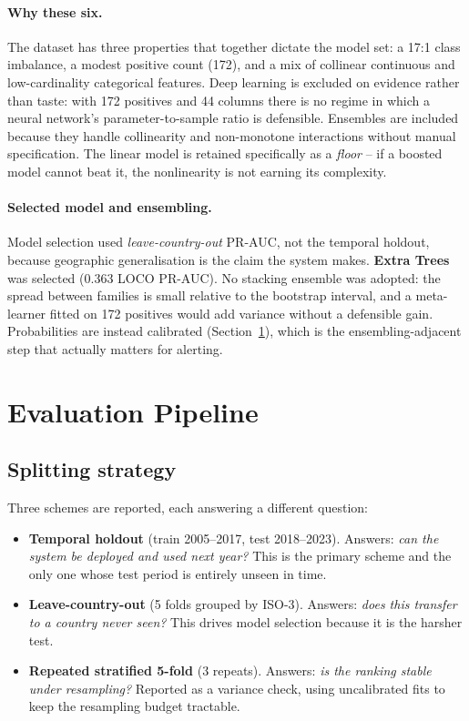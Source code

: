 \documentclass[11pt]{article}
\begin{document}
\paragraph{Why these six.} The dataset has three properties that together dictate the model set:
a 17:1 class imbalance, a modest positive count
(172), and a mix of collinear continuous and low-cardinality categorical features.
Deep learning is excluded on evidence rather than taste: with 172 positives and 44
columns there is no regime in which a neural network's parameter-to-sample ratio is defensible.
Ensembles are included because they handle collinearity and non-monotone interactions without
manual specification. The linear model is retained specifically as a \emph{floor} -- if a
boosted model cannot beat it, the nonlinearity is not earning its complexity.

\paragraph{Selected model and ensembling.} Model selection used \emph{leave-country-out} PR-AUC,
not the temporal holdout, because geographic generalisation is the claim the system makes.
\textbf{Extra Trees} was selected (0.363 LOCO PR-AUC). No stacking ensemble was
adopted: the spread between families is small relative to the bootstrap interval, and a meta-learner
fitted on 172 positives would add variance without a defensible gain. Probabilities
are instead calibrated (Section~\ref{sec:eval}), which is the ensembling-adjacent step that
actually matters for alerting.

\section{Evaluation Pipeline}
\label{sec:eval}

\subsection{Splitting strategy}

Three schemes are reported, each answering a different question:

\begin{itemize}
  \item \textbf{Temporal holdout} (train 2005--2017, test 2018--2023). Answers: \emph{can the
        system be deployed and used next year?} This is the primary scheme and the only one whose
        test period is entirely unseen in time.
  \item \textbf{Leave-country-out} (5 folds grouped by ISO-3). Answers: \emph{does this transfer
        to a country never seen?} This drives model selection because it is the harsher test.
  \item \textbf{Repeated stratified 5-fold} (3 repeats). Answers: \emph{is the ranking stable
        under resampling?} Reported as a variance check, using uncalibrated fits to keep the
        resampling budget tractable.
\end{itemize}
\end{document}

